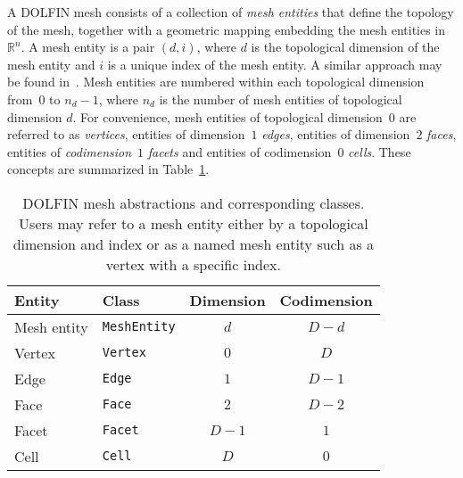 \documentclass[acmtoms]{acmtrans2m}
\newcommand{\R}{\mathbb{R}}
\newcommand{\emp}[1]{\texttt{#1}}
\newcommand{\dolfin}{DOLFIN}
\begin{document}
A \dolfin{} mesh consists of a collection of \emph{mesh entities} that
define the topology of the mesh, together with a geometric mapping
embedding the mesh entities in $\R^n$. A mesh entity is a pair
$(d, i)$, where $d$ is the topological dimension of the mesh entity and $i$
is a unique index of the mesh entity. A similar approach may be found
in~. Mesh entities are numbered within each
topological dimension from~$0$ to $n_{d}-1$, where $n_{d}$ is the number
of mesh entities of topological dimension $d$. For convenience, mesh
entities of topological dimension~$0$ are referred to as
\emph{vertices}, entities of dimension~$1$ \emph{edges}, entities of
dimension~$2$ \emph{faces}, entities of \emph{codimension}~$1$
\emph{facets} and entities of codimension~$0$ \emph{cells}. These
concepts are summarized in Table~\ref{tab:entities}.
\begin{table}
  \begin{center}
    \begin{tabular}{|l|l|c|c|}
      \hline
      Entity & Class & Dimension & Codimension \\
      \hline
      \hline
      Mesh entity & \emp{MeshEntity} & $d$       & $D - d$ \\
      \hline
      Vertex      & \emp{Vertex}     & $0$       & $D$     \\
      Edge        & \emp{Edge}       & $1$       & $D - 1$ \\
      Face        & \emp{Face}       & $2$       & $D - 2$ \\
      \hline
      Facet       & \emp{Facet}      & $D - 1$   &  $1$    \\
      Cell        & \emp{Cell}       & $D$       &  $0$    \\
      \hline
    \end{tabular}
    \caption{\dolfin{} mesh abstractions and corresponding classes.
      Users may refer to a mesh entity either by a topological
      dimension and index or as a named mesh entity such as a vertex
      with a specific index.}
    \label{tab:entities}
  \end{center}
\end{table}
\end{document}
